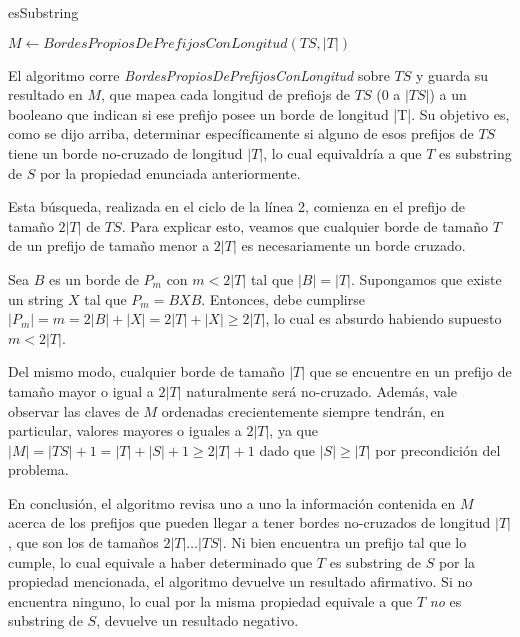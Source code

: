 \bigskip

\begin{algorithm}[H]
	\caption{esSubstring}

	$M \gets \mathit{BordesPropiosDePrefijosConLongitud}(TS, |T|)$
	
	 {
		 {
		}
	}

\end{algorithm}

\bigskip

El algoritmo corre \textit{BordesPropiosDePrefijosConLongitud} sobre $TS$ y guarda su resultado en $M$, que mapea cada longitud de prefiojs de $TS$ ($0$ a $|TS|$) a un booleano que indican si ese prefijo posee un borde de longitud |T|. Su objetivo es, como se dijo arriba, determinar específicamente si alguno de esos prefijos de $TS$ tiene un borde no-cruzado de longitud $|T|$, lo cual equivaldría a que $T$ es substring de $S$ por la propiedad enunciada anteriormente.

Esta búsqueda, realizada en el ciclo de la línea 2, comienza en el prefijo de tamaño $2|T|$ de $TS$. Para explicar esto, veamos que cualquier borde de tamaño $T$ de un prefijo de tamaño menor a $2|T|$ es necesariamente un borde cruzado.

Sea $B$ es un borde de $P_m$ con $m < 2|T|$ tal que $|B| = |T|$. Supongamos que existe un string $X$ tal que $P_m = BXB$. Entonces, debe cumplirse $|P_m| = m = 2|B|+|X| = 2|T| + |X| \geq 2|T|$, lo cual es absurdo habiendo supuesto $m < 2|T|$.

Del mismo modo, cualquier borde de tamaño $|T|$ que se encuentre en un prefijo de tamaño mayor o igual a $2|T|$ naturalmente será no-cruzado. Además, vale observar las claves de $M$ ordenadas crecientemente siempre tendrán, en particular, valores mayores o iguales a $2|T|$, ya que $|M| = |TS|+1 = |T|+|S|+1 \geq 2|T| + 1$ dado que $|S| \geq |T|$ por precondición del problema.

En conclusión, el algoritmo revisa uno a uno la información contenida en $M$ acerca de los prefijos que pueden llegar a tener bordes no-cruzados de longitud $|T|$, que son los de tamaños $2|T| \dots |TS|$. Ni bien encuentra un prefijo tal que lo cumple, lo cual equivale a haber determinado que $T$ es substring de $S$ por la propiedad mencionada, el algoritmo devuelve un resultado afirmativo. Si no encuentra ninguno, lo cual por la misma propiedad equivale a que $T$ \textit{no} es substring de $S$, devuelve un resultado negativo.
 
